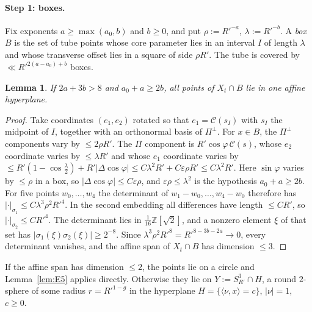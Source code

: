 \documentclass[aps,prx,twocolumn,superscriptaddress,nofootinbib,longbibliography]{revtex4-2}
\theoremstyle{plain}
\newtheorem{lemma}{Lemma}
\theoremstyle{definition}
\theoremstyle{remark}
\newcommand{\Z}{\mathbb{Z}}
\begin{document}
\paragraph{Step 1: boxes.} Fix exponents $a\ge\max(a_0,b)$ and $b\ge0$, and put $\rho:=R'^{-a}$, $\lambda:=R'^{-b}$. A \emph{box} $B$ is the set of tube points whose core parameter lies in an interval $I$ of length $\lambda$ and whose transverse offset lies in a square of side $\rho R'$. The tube is covered by $\ll R'^{2(a-a_0)+b}$ boxes.

\begin{lemma}\label{lem:E1}
If $2a+3b>8$ and $a_0+a\ge2b$, all points of $X_t\cap B$ lie in one affine hyperplane.
\end{lemma}
\begin{proof}
Take coordinates $(e_1,e_2)$ rotated so that $e_1=\mathcal C(s_I)$ with $s_I$ the midpoint of $I$, together with an orthonormal basis of $\Pi^\perp$. For $x\in B$, the $\Pi^\perp$ components vary by $\le2\rho R'$. The $\Pi$ component is $R'\cos\varphi\,\mathcal C(s)$, whose $e_2$ coordinate varies by $\le\lambda R'$ and whose $e_1$ coordinate varies by $\le R'(1-\cos\tfrac\lambda2)+R'|\Delta\cos\varphi|\le C\lambda^2R'+C\varepsilon\rho R'\le C\lambda^2R'$. Here $\sin\varphi$ varies by $\le\rho$ in a box, so $|\Delta\cos\varphi|\le C\varepsilon\rho$, and $\varepsilon\rho\le\lambda^2$ is the hypothesis $a_0+a\ge2b$. For five points $w_0,\dots,w_4$ the determinant of $w_1-w_0,\dots,w_4-w_0$ therefore has $|\cdot|_{\sigma_1}\le C\lambda^3\rho^2R'^4$. In the second embedding all differences have length $\le CR'$, so $|\cdot|_{\sigma_2}\le CR'^4$. The determinant lies in $\tfrac1{16}\Z[\sqrt2]$, and a nonzero element $\xi$ of that set has $|\sigma_1(\xi)\sigma_2(\xi)|\ge2^{-8}$. Since $\lambda^3\rho^2R'^8=R'^{8-3b-2a}\to0$, every determinant vanishes, and the affine span of $X_t\cap B$ has dimension $\le3$.
\end{proof}

If the affine span has dimension $\le2$, the points lie on a circle and Lemma~\ref{lem:E5} applies directly. Otherwise they lie on $Y:=S^3_{R'}\cap H$, a round $2$-sphere of some radius $r=R'^{1-g}$ in the hyperplane $H=\{\langle\nu,x\rangle=c\}$, $|\nu|=1$, $c\ge0$.
\end{document}
